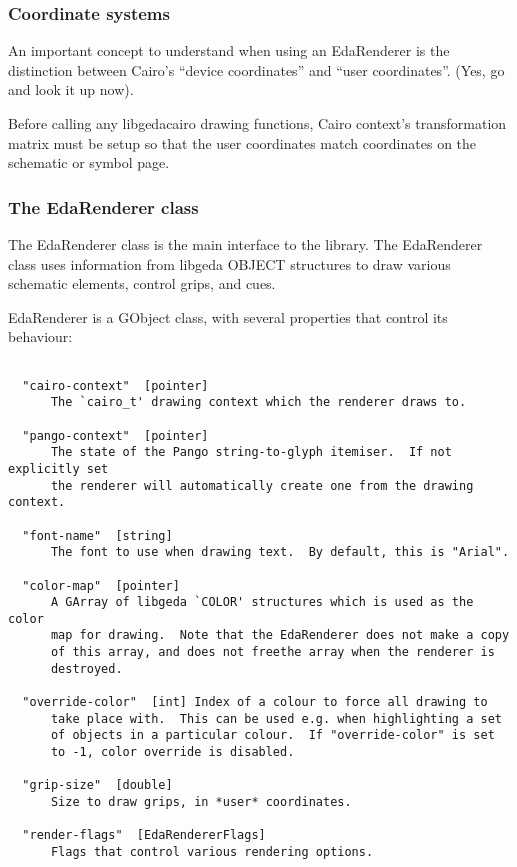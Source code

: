 \subsubsection*{Coordinate systems}


  An important concept to understand when using an EdaRenderer is the distinction between Cairo's ``device coordinates'' and ``user coordinates''. (Yes, go and look it up now). 


  Before calling any libgedacairo drawing functions, Cairo context's transformation matrix must be setup so that the user coordinates match coordinates on the schematic or symbol page. 


 
\subsubsection*{The EdaRenderer class}
 The EdaRenderer class is the main interface to the library. The EdaRenderer class uses information from libgeda OBJECT structures to draw various schematic elements, control grips, and cues. 

  EdaRenderer is a GObject class, with several properties that control its behaviour: \begin{verbatim}
	
  "cairo-context"  [pointer]
      The `cairo_t' drawing context which the renderer draws to.

  "pango-context"  [pointer]
      The state of the Pango string-to-glyph itemiser.  If not explicitly set
      the renderer will automatically create one from the drawing context.

  "font-name"  [string]
      The font to use when drawing text.  By default, this is "Arial".

  "color-map"  [pointer]
      A GArray of libgeda `COLOR' structures which is used as the color
      map for drawing.  Note that the EdaRenderer does not make a copy
      of this array, and does not freethe array when the renderer is
      destroyed.

  "override-color"  [int] Index of a colour to force all drawing to
      take place with.  This can be used e.g. when highlighting a set
      of objects in a particular colour.  If "override-color" is set
      to -1, color override is disabled.

  "grip-size"  [double]
      Size to draw grips, in *user* coordinates.

  "render-flags"  [EdaRendererFlags]
      Flags that control various rendering options.
   
\end{verbatim}



